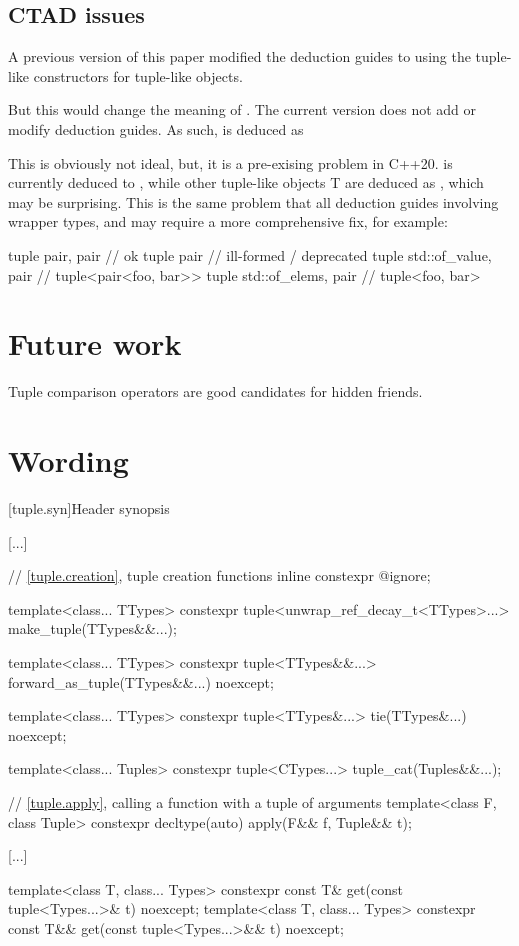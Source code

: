 \documentclass{wg21}
\begin{document}
\subsection{CTAD issues}

A previous version of this paper modified the deduction guides to using the tuple-like constructors for tuple-like objects.

But this would change the meaning of .
The current version does not add or modify deduction guides.
As such,  is deduced as 

This is obviously not ideal, but, it is a pre-exising problem in C++20.  is currently deduced to , 
while other tuple-like objects T are deduced as , which may be surprising.
This is the same problem that all deduction guides involving wrapper types, and may require a more comprehensive fix, for example:

\begin{colorblock}
tuple {pair, pair } // ok
tuple {pair} // ill-formed / deprecated 
tuple {std::of_value, pair }  // tuple<pair<foo, bar>>
tuple {std::of_elems, pair }  // tuple<foo, bar>
\end{colorblock}


\section{Future work}

Tuple comparison operators are good candidates for hidden friends. 

\section{Wording}


[tuple.syn]{Header  synopsis}

\begin{codeblock}
 
[...]

// \ref{tuple.creation}, tuple creation functions
inline constexpr @\unspec@ ignore;

template<class... TTypes>
constexpr tuple<unwrap_ref_decay_t<TTypes>...> make_tuple(TTypes&&...);

template<class... TTypes>
constexpr tuple<TTypes&&...> forward_as_tuple(TTypes&&...) noexcept;

template<class... TTypes>
constexpr tuple<TTypes&...> tie(TTypes&...) noexcept;

template<class... Tuples>
constexpr tuple<CTypes...> tuple_cat(Tuples&&...);

// \ref{tuple.apply}, calling a function with a tuple of arguments
template<class F, class Tuple>
constexpr decltype(auto) apply(F&& f, Tuple&& t);


[...] 
    
template<class T, class... Types>
constexpr const T& get(const tuple<Types...>& t) noexcept;
template<class T, class... Types>
constexpr const T&& get(const tuple<Types...>&& t) noexcept;   
\end{codeblock}
\end{document}
